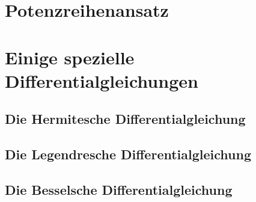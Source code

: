 \documentclass[a4paper, 11pt, accentcolor = tud3b]{tudreport}
\begin{document}
		\section{Potenzreihenansatz} %

		\section{Einige spezielle Differentialgleichungen} %

			\subsection{Die Hermitesche Differentialgleichung} %

			\subsection{Die Legendresche Differentialgleichung} %

			\subsection{Die Besselsche Differentialgleichung} %
\end{document}
